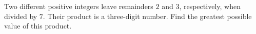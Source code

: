 Two different positive integers leave remainders $2$ and $3$, respectively, when divided by $7$. Their product is a three-digit number. Find the greatest possible value of this product.
